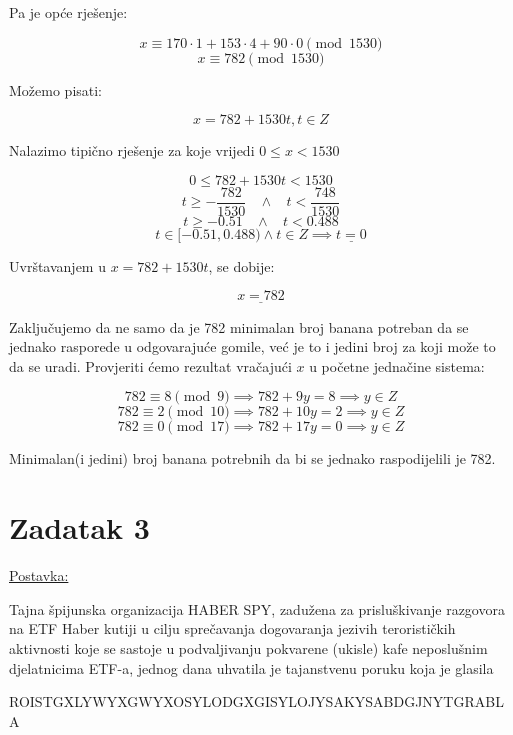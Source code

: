 \documentclass[12pt]{article}
\begin{document}
Pa je opće rješenje:

$$x \equiv 170 \cdot 1 + 153 \cdot 4 + 90 \cdot 0 \pmod{1530}$$
$$x \equiv 782 \pmod{1530}$$

Možemo pisati:

$$x = 782 + 1530t, t\in Z$$\vspace{1mm}

Nalazimo tipično rješenje za koje vrijedi $0 \leq x < 1530$

$$0 \leq 782 + 1530t < 1530$$\vspace{1mm}
$$t \geq - \frac{782}{1530} \>\>\>\> \land \>\>\>\> t < \frac{748}{1530}$$\vspace{1mm}
$$t \geq - 0.51 \>\>\>\> \land \>\>\>\> t < 0.488$$\vspace{1mm}
$$t\in [-0.51, 0.488) \land t \in Z \implies \underline{t = 0}$$\vspace{1mm}

Uvrštavanjem u $x = 782 + 1530t$, se dobije:

$$\underline{x = 782}$$\vspace{1mm}

Zaključujemo da ne samo da je 782 minimalan broj banana potreban da se jednako rasporede u odgovarajuće gomile, već je to i jedini broj za koji može to da se uradi. Provjeriti ćemo rezultat vračajući $x$ u početne jednačine sistema:

$$782 \equiv 8 \pmod{9} \implies 782 + 9y = 8 \implies y \in Z$$
$$782 \equiv 2 \pmod{10} \implies 782 + 10y = 2 \implies y \in Z$$
$$782 \equiv 0 \pmod{17} \implies 782 + 17y = 0 \implies y \in Z$$\vspace{1mm}

Minimalan(i jedini) broj banana potrebnih da bi se jednako raspodijelili je 782.

\newpage

\section*{Zadatak 3\label{Z3}}

\underline{Postavka:}

Tajna špijunska organizacija HABER SPY, zadužena za prisluškivanje razgovora na ETF Haber kutiji u cilju sprečavanja dogovaranja jezivih terorističkih aktivnosti koje se sastoje u podvaljivanju pokvarene (ukisle) kafe neposlušnim djelatnicima ETF-a, jednog dana uhvatila je tajanstvenu poruku koja je glasila

ROISTGXLYWYXGWYXOSYLODGXGISYLOJYSAKYSABDGJNYTGRABLA
\end{document}
